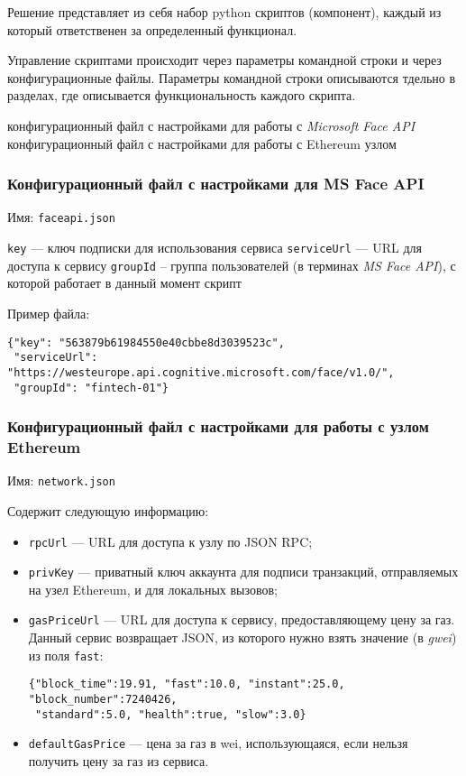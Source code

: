 Решение представляет из себя набор python скриптов (компонент), каждый
из который ответственен за определенный функционал. 

Управление скриптами происходит через параметры командной строки и
через конфигурационные файлы. Параметры командной строки описываются 
тдельно в разделах, где описывается функциональность каждого скрипта.

{конфигурационный файл с настройками для работы с \textit{Microsoft Face API}}
{конфигурационный файл с настройками для работы с Ethereum узлом}

\subsubsection*{Конфигурационный файл с настройками для MS Face API}

Имя: \texttt{faceapi.json}

{\texttt{key} --- ключ подписки для использования сервиса}
{\texttt{serviceUrl} --- URL для доступа к сервису}
{\texttt{groupId} -- группа пользователей (в терминах \textit{MS Face API}),
с которой работает в данный момент скрипт}

Пример файла:
\begin{verbatim}
{"key": "563879b61984550e40cbbe8d3039523c",
 "serviceUrl": "https://westeurope.api.cognitive.microsoft.com/face/v1.0/",
 "groupId": "fintech-01"}
\end{verbatim}

\subsubsection*{Конфигурационный файл с настройками для работы с узлом Ethereum}

Имя: \texttt{network.json}

Содержит следующую информацию:
\begin{itemize}
  \item \texttt{rpcUrl} --- URL для доступа к узлу по JSON RPC;
  
  \item \texttt{privKey} --- приватный ключ аккаунта для подписи транзакций,
  отправляемых на узел Ethereum, и для локальных вызовов;
  
  \item \texttt{gasPriceUrl} --- URL для доступа к сервису, предоставляющему
  цену за газ. Данный сервис возвращает JSON, из которого нужно взять
  значение (в \textit{gwei}) из поля \texttt{fast}:
    \begin{verbatim}
{"block_time":19.91, "fast":10.0, "instant":25.0, "block_number":7240426,
 "standard":5.0, "health":true, "slow":3.0}
    \end{verbatim}
  
  \item \texttt{defaultGasPrice} --- цена за газ в wei, использующаяся,
  если нельзя получить цену за газ из сервиса.

\end{itemize}

